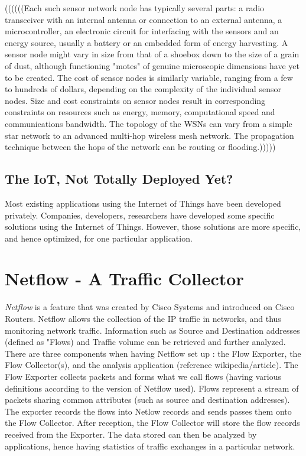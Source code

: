 ((((((Each such sensor network node has typically several parts: a radio transceiver with an internal antenna or connection to an external antenna, a microcontroller, an electronic circuit for interfacing with the sensors and an energy source, usually a battery or an embedded form of energy harvesting. A sensor node might vary in size from that of a shoebox down to the size of a grain of dust, although functioning "motes" of genuine microscopic dimensions have yet to be created. The cost of sensor nodes is similarly variable, ranging from a few to hundreds of dollars, depending on the complexity of the individual sensor nodes. Size and cost constraints on sensor nodes result in corresponding constraints on resources such as energy, memory, computational speed and communications bandwidth. The topology of the WSNs can vary from a simple star network to an advanced multi-hop wireless mesh network. The propagation technique between the hops of the network can be routing or flooding.)))))\\

\subsection{The IoT, Not Totally Deployed Yet?}

Most existing applications using the Internet of Things have been developed privately. Companies, developers, researchers have developed some specific solutions using the Internet of Things. However, those solutions are more specific, and hence optimized, for one particular application.\\

\section{Netflow - A Traffic Collector}
\textit{Netflow} is a feature that was created by Cisco Systems and introduced on Cisco Routers. Netflow allows the collection of the IP traffic in networks, and thus monitoring network traffic. Information such as Source and Destination addresses (defined as "Flows) and Traffic volume can be retrieved and further analyzed.\\

There are three components when having Netflow set up : the Flow Exporter, the Flow Collector(s), and the analysis application (reference wikipedia/article). The Flow Exporter collects packets and forms what we call flows (having various definitions according to the version of Netflow used). Flows represent a stream of packets sharing common attributes (such as source and destination addresses). The exporter records the flows into Netlow records and sends passes them onto the Flow Collector. After reception, the Flow Collector will store the flow records received from the Exporter. The data stored can then be analyzed by applications, hence having statistics of traffic exchanges in a particular network.\\

